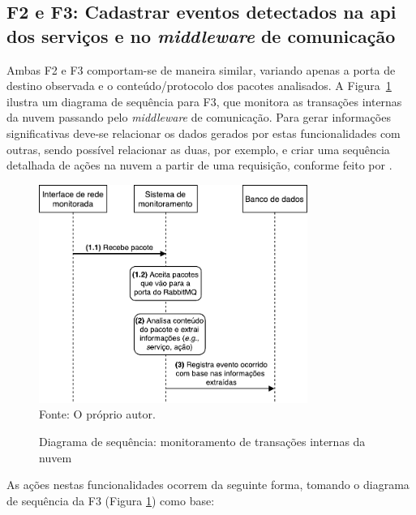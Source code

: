 \subsection{F2 e F3: Cadastrar eventos detectados na \ac{api} dos serviços e no \textit{middleware} de comunicação}

Ambas F2 e F3 comportam-se de maneira similar, variando apenas a porta de destino observada e o conteúdo/protocolo dos pacotes analisados.
%
A Figura~\ref{fig:proposta_sequencia_transacao} ilustra um diagrama de sequência para F3, que monitora as transações internas da nuvem passando pelo \textit{middleware} de comunicação.
%
Para gerar informações significativas deve-se relacionar os dados gerados por estas funcionalidades com outras, sendo possível relacionar as duas, por exemplo, e criar uma sequência detalhada de ações na nuvem a partir de uma requisição, conforme feito por .

\begin{figure}[!htb]
	\centering
	\caption{Diagrama de sequência: monitoramento de transações internas da nuvem}
	\includegraphics[width=0.78\textwidth]{img/sequencia_monitoramentoTarefas.pdf}
	\label{fig:proposta_sequencia_transacao}\\
	Fonte: O próprio autor.
\end{figure}

As ações nestas funcionalidades ocorrem da seguinte forma, tomando o diagrama de sequência da F3 (Figura \ref{fig:proposta_sequencia_transacao}) como base:


